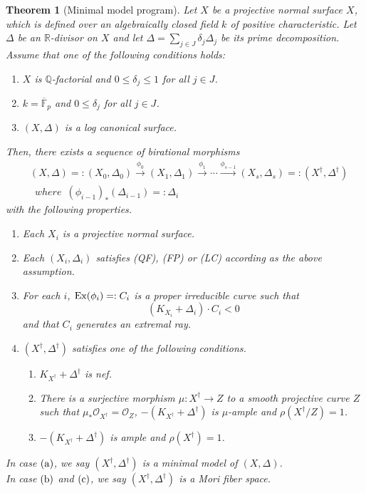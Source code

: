 \documentclass[12pt,twoside]{amsart}
\newtheorem{thm}{Theorem}[section]
\theoremstyle{definition}
\newcommand{\Q}{$\mathbb{Q}$}
\begin{document}
\begin{thm}[Minimal model program]\label{0mmp}
Let $X$ be a projective normal surface $X$, 
which is defined over an algebraically closed field $k$ of positive characteristic. 
Let $\Delta$ be an $\mathbb{R}$-divisor on $X$ and 
let $\Delta=\sum_{j\in J}\delta_j\Delta_j$ be its prime decomposition. 
Assume that one of the following conditions holds{\em{:}}
\begin{enumerate}
\item[(QF)]{$X$ is \Q-factorial and $0\leq \delta_j\leq 1$ for all $j\in J$.}
\item[(FP)]{$k=\overline{\mathbb{F}}_p$ and $0\leq\delta_j$ for all $j\in J$.}
\item[(LC)]{$(X, \Delta)$ is a log canonical surface.}
\end{enumerate}
Then, there exists a sequence of birational morphisms 
\begin{eqnarray*}
&(X, \Delta)=:(X_0, \Delta_0) \overset{\phi_0}\to 
(X_1, \Delta_1) \overset{\phi_1}\to \cdots 
\overset{\phi_{s-1}}\to (X_s, \Delta_s)=:(X^{\dagger}, \Delta^{\dagger})\\
&\,\,\,where\,\,\,(\phi_{i-1})_*(\Delta_{i-1})=:\Delta_i
\end{eqnarray*}
with the following properties. 
\begin{enumerate}
\item{Each $X_i$ is a projective normal surface.}
\item{Each $(X_i, \Delta_i)$ satisfies {\em (QF)}, {\em (FP)} 
or {\em (LC)} according as the above assumption.}
\item{For each $i$, ${\rm Ex}(\phi_i)=:C_i$ is a proper irreducible curve such that 
$$(K_{X_i}+\Delta_i)\cdot C_i<0$$
and that $C_i$ generates an extremal ray.}
\item{$(X^{\dagger}, \Delta^{\dagger})$ satisfies one of the following conditions.
\begin{enumerate}
\item{$K_{X^{\dagger}}+\Delta^{\dagger}$ is nef.}
\item{There is a surjective morphism $\mu:X^{\dagger} \to Z$ to 
a smooth projective curve $Z$ such that $\mu_*\mathcal O_{X^{\dagger}}=\mathcal O_Z$, 
$-(K_{X^{\dagger}}+\Delta^{\dagger})$ is $\mu$-ample and $\rho(X^{\dagger}/Z)=1$.}
\item{$-(K_{X^{\dagger}}+\Delta^{\dagger})$ is ample and 
$\rho(X^{\dagger})=1$.}
\end{enumerate}}
\end{enumerate}
In case $({\rm a})$, we say $(X^{\dagger}, \Delta^{\dagger})$ is a minimal model of $(X, \Delta)$.\\
In case $({\rm b})$ and $({\rm c})$, we say $(X^{\dagger}, \Delta^{\dagger})$ is a Mori fiber space. 
\end{thm}
\end{document}
